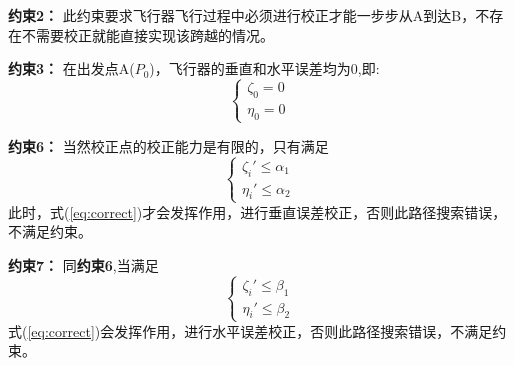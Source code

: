 \noindent \textbf{约束2：} 此约束要求飞行器飞行过程中必须进行校正才能一步步从A到达B，不存在不需要校正就能直接实现该跨越的情况。

\noindent \textbf{约束3：} 在出发点A($P_0$)，飞行器的垂直和水平误差均为0,即:
\begin{equation}
\left\{\begin{matrix}
    \zeta_{0}  = 0 \\
    \eta_{0}  = 0
\end{matrix}\right.
\end{equation}

\noindent \textbf{约束6：} 当然校正点的校正能力是有限的，只有满足
\begin{equation}
\left\{\begin{matrix}
    \zeta_{i}'  \leq \alpha_1 \\
    \eta_{i}' \leq \alpha_2
\end{matrix}\right.
\end{equation}
此时，式(\ref{eq:correct})才会发挥作用，进行垂直误差校正，否则此路径搜索错误，不满足约束。

\noindent \textbf{约束7：} 同\textbf{约束6},当满足
\begin{equation}
\left\{\begin{matrix}
    \zeta_{i}'  \leq \beta_1 \\
    \eta_{i}' \leq \beta_2
\end{matrix}\right.
\end{equation}
式(\ref{eq:correct})会发挥作用，进行水平误差校正，否则此路径搜索错误，不满足约束。

